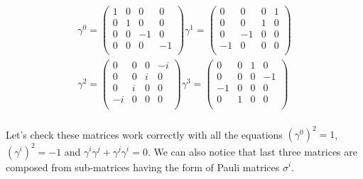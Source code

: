 \begin{equation*}
    \begin{gathered}
        \gamma^{0} = 
         \begin{pmatrix}
          1 & 0 & 0 & 0 \\
          0 & 1 & 0 & 0 \\
          0 & 0 & -1 & 0 \\
          0 & 0 & 0 & -1 \\
         \end{pmatrix}
        \gamma^{1} = 
         \begin{pmatrix}
          0 & 0 & 0 & 1 \\
          0 & 0 & 1 & 0 \\
          0 & -1 & 0 & 0 \\
          -1 & 0 & 0 & 0 \\
         \end{pmatrix} \\
        \gamma^{2} = 
         \begin{pmatrix}
          0 & 0 & 0 & -i \\
          0 & 0 & i & 0 \\
          0 & i & 0 & 0 \\
          -i & 0 & 0 & 0 \\
         \end{pmatrix}
        \gamma^{3} = 
         \begin{pmatrix}
          0 & 0 & 1 & 0 \\
          0 & 0 & 0 & -1 \\
          -1 & 0 & 0 & 0 \\
          0 & 1 & 0 & 0 \\
         \end{pmatrix} \\
    \end{gathered}
\end{equation*}

Let's check these matrices work correctly with all the equations $(\gamma^{0})^{2} = 1$, $(\gamma^{i})^{2} = -1$ and $\gamma^{i} \gamma^{j} + \gamma^{j} \gamma^{i} = 0$.
We can also notice that last three matrices are composed from sub-matrices having the form of Pauli matrices $\sigma^{i}$.

